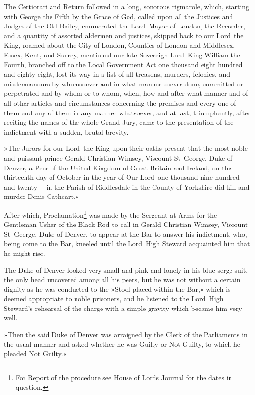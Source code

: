 The Certiorari and Return followed in a long, sonorous rigmarole, which, starting with George the Fifth by the Grace of God, called upon all the Justices and Judges of the Old Bailey, enumerated the Lord~Mayor of London, the Recorder, and a quantity of assorted aldermen and justices, skipped back to our Lord~the King, roamed about the City of London, Counties of London and Middlesex, Essex, Kent, and Surrey, mentioned our late Sovereign Lord~King William the Fourth, branched off to the Local Government Act one thousand eight hundred and eighty-eight, lost its way in a list of all treasons, murders, felonies, and misdemeanours by whomsoever and in what manner soever done, committed or perpetrated and by whom or to whom, when, how and after what manner and of all other articles and circumstances concerning the premises and every one of them and any of them in any manner whatsoever, and at last, triumphantly, after reciting the names of the whole Grand Jury, came to the presentation of the indictment with a sudden, brutal brevity.

»The Jurors for our Lord~the King upon their oaths present that the most noble and puissant prince Gerald Christian Wimsey, Viscount St~George, Duke of Denver, a Peer of the United Kingdom of Great Britain and Ireland, on the thirteenth day of October in the year of Our Lord~one thousand nine hundred and twenty— in the Parish of Riddlesdale in the County of Yorkshire did kill and murder Denis Cathcart.«

After which, Proclamation\footnote{For Report of the procedure see House of Lords Journal for the dates in question.} was made by the Sergeant-at-Arms for the Gentleman Usher of the Black Rod to call in Gerald Christian Wimsey, Viscount St~George, Duke of Denver, to appear at the Bar to answer his indictment, who, being come to the Bar, kneeled until the Lord~High Steward acquainted him that he might rise.

The Duke of Denver looked very small and pink and lonely in his blue serge suit, the only head uncovered among all his peers, but he was not without a certain dignity as he was conducted to the »Stool placed within the Bar,« which is deemed appropriate to noble prisoners, and he listened to the Lord~High Steward's rehearsal of the charge with a simple gravity which became him very well.

»Then the said Duke of Denver was arraigned by the Clerk of the Parliaments in the usual manner and asked whether he was Guilty or Not Guilty, to which he pleaded Not Guilty.«


